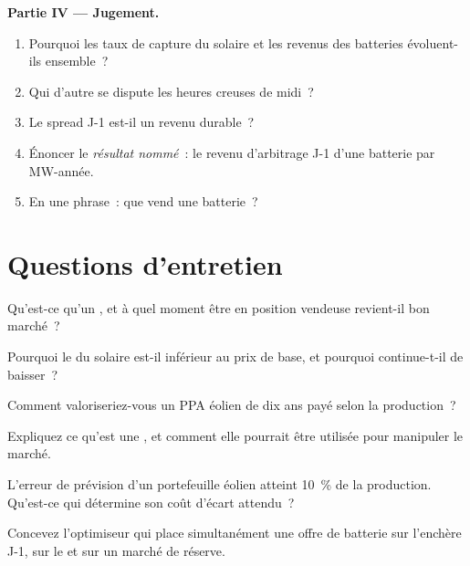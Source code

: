 \begin{problem}
\medskip\noindent\textbf{Partie IV --- Jugement.}
\begin{enumerate}[resume]
\item Pourquoi les taux de capture du solaire et les revenus des batteries évoluent-ils ensemble~?
\item Qui d'autre se dispute les heures creuses de midi~?
\item Le spread J-1 est-il un revenu durable~?
\item Énoncer le \emph{résultat nommé}~: le revenu d'arbitrage J-1 d'une batterie par MW-année.
\item En une phrase~: que vend une batterie~?
\end{enumerate}
\end{problem}

\section{Questions d'entretien}

\begin{interviewq}\label{iq:m3:power-markets-trading:1}
Qu'est-ce qu'un , et à quel moment être en position vendeuse revient-il bon marché~?
\end{interviewq}

\begin{interviewq}\label{iq:m3:power-markets-trading:2}
Pourquoi le  du solaire est-il inférieur au prix de base, et pourquoi continue-t-il de baisser~?
\end{interviewq}

\begin{interviewq}\label{iq:m3:power-markets-trading:3}
Comment valoriseriez-vous un PPA éolien de dix ans payé selon la production~?
\end{interviewq}

\begin{interviewq}\label{iq:m3:power-markets-trading:4}
Expliquez ce qu'est une , et comment elle pourrait être utilisée pour manipuler le marché.
\end{interviewq}

\begin{interviewq}\label{iq:m3:power-markets-trading:5}
L'erreur de prévision d'un portefeuille éolien atteint 10~\% de la production. Qu'est-ce qui détermine son
coût d'écart attendu~?
\end{interviewq}

\begin{interviewq}\label{iq:m3:power-markets-trading:6}
Concevez l'optimiseur qui place simultanément une offre de batterie sur l'enchère J-1, sur le  et sur un marché de réserve.
\end{interviewq}
